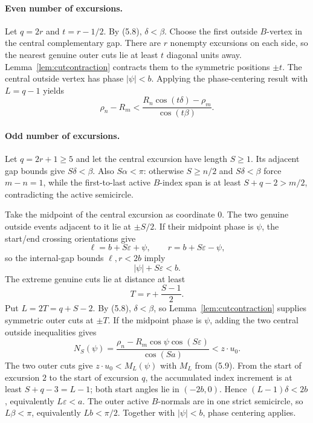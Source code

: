 \documentclass[11pt]{article}
\theoremstyle{remark}
\begin{document}
\paragraph{Even number of excursions.}
Let $q=2r$ and $t=r-1/2$. By (5.8), $\delta<\beta$. Choose the first outside $B$-vertex in the central complementary gap. There are $r$ nonempty excursions on each side, so the nearest genuine outer cuts lie at least $t$ diagonal units away. Lemma~\ref{lem:cutcontraction} contracts them to the symmetric positions $\pm t$. The central outside vertex has phase $|\psi|<b$. Applying the phase-centering result with $L=q-1$ yields
\[
\boxed{
\rho_n-R_m<
\frac{R_n\cos(t\delta)-\rho_m}{\cos(t\beta)}.}
\tag{5.11}
\]

\paragraph{Odd number of excursions.}
Let $q=2r+1\ge5$ and let the central excursion have length $S\ge1$. Its adjacent gap bounds give $S\delta<\beta$. Also $S\alpha<\pi$: otherwise $S\ge n/2$ and $S\delta<\beta$ force $m-n=1$, while the first-to-last active $B$-index span is at least $S+q-2>m/2$, contradicting the active semicircle.

Take the midpoint of the central excursion as coordinate $0$. The two genuine outside events adjacent to it lie at $\pm S/2$. If their midpoint phase is $\psi$, the start/end crossing orientations give
\[
\ell=b+S\varepsilon+\psi,\qquad r=b+S\varepsilon-\psi,
\]
so the internal-gap bounds $\ell,r<2b$ imply
\[
|\psi|+S\varepsilon<b.
\]
The extreme genuine cuts lie at distance at least
\[
T=r+\frac{S-1}{2}.
\]
Put $L=2T=q+S-2$. By (5.8), $\delta<\beta$, so Lemma~\ref{lem:cutcontraction} supplies symmetric outer cuts at $\pm T$. If the midpoint phase is $\psi$, adding the two central outside inequalities gives
\[
N_S(\psi)=
\frac{\rho_n-R_m\cos\psi\cos(S\varepsilon)}{\cos(Sa)}
<z\cdot u_0.
\tag{5.12}
\]
The two outer cuts give $z\cdot u_0<M_L(\psi)$ with $M_L$ from (5.9). From the start of excursion $2$ to the start of excursion $q$, the accumulated index increment is at least $S+q-3=L-1$; both start angles lie in $(-2b,0)$. Hence $(L-1)\delta<2b$, equivalently $L\varepsilon<a$. The outer active $B$-normals are in one strict semicircle, so $L\beta<\pi$, equivalently $Lb<\pi/2$. Together with $|\psi|<b$, phase centering applies.
\end{document}
